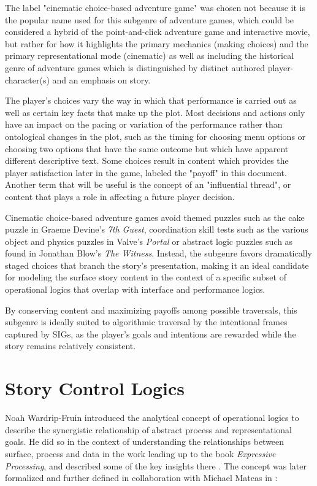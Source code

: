 \documentclass{llncs}
\begin{document}
The label "cinematic choice-based adventure game" was chosen not
because it is the popular name used for this subgenre of adventure
games, which could be considered a hybrid of the point-and-click
adventure game and interactive movie, but rather for how it highlights
the primary mechanics (making choices) and the primary
representational mode (cinematic) as well as including the historical
genre of adventure games which is distinguished by distinct authored
player-character(s) and an emphasis on story.

The player's choices vary the way in which that performance is
carried out as well as certain key facts that make up the plot. Most
decisions and actions only have an impact on the pacing or variation
of the performance rather than ontological changes in the plot, such
as the timing for choosing menu options or choosing two options that
have the same outcome but which have apparent different descriptive
text. Some choices result in content which provides the player
satisfaction later in the game, labeled the "payoff" in this
document. Another term that will be useful is the concept of an
"influential thread", or content that plays a role in affecting a
future player decision.

Cinematic choice-based adventure games avoid themed puzzles such as
the cake puzzle in Graeme Devine's \emph{7th Guest}, coordination skill
tests such as the various object and physics puzzles in Valve's
\emph{Portal} or abstract logic puzzles such as found in Jonathan Blow's
\emph{The Witness}. Instead, the subgenre favors dramatically staged
choices that branch the story's presentation, making it an ideal
candidate for modeling the surface story content in the context of a
specific subset of operational logics that overlap with interface and
performance logics.

By conserving content and maximizing payoffs among possible
traversals, this subgenre is ideally suited to algorithmic traversal
by the intentional frames captured by SIGs, as the player’s goals and
intentions are rewarded while the story remains relatively consistent.

\section*{Story Control Logics}
\label{sec:orgheadline9}
Noah Wardrip-Fruin introduced the analytical concept of operational
logics \cite{Wardrip-fruin} to describe the synergistic relationship
of abstract process and representational goals. He did so in the
context of understanding the relationships between surface, process
and data in the work leading up to the book \emph{Expressive Processing},
and described some of the key insights there \cite{Wardrip-Fruin2009}.
The concept was later formalized and further defined in collaboration
with Michael Mateas in \cite{Mateas2009b}:
\end{document}

